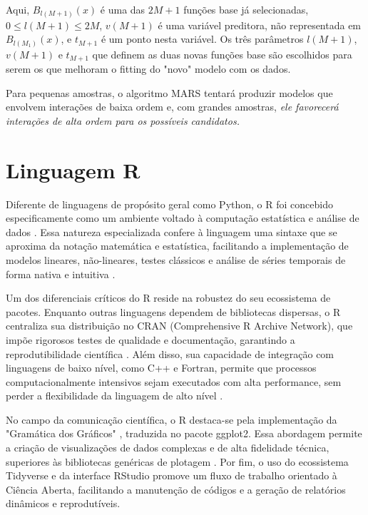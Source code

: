 \documentclass[
    12pt,               %
    openright,          %
    oneside,            %
    a4paper,            %
    english,            %
    brazil              %
    ]{abntex2}
\begin{document}
Aqui, $B_{l(M+1)}(x)$ é uma das $2M + 1$ funções base já selecionadas, $0 \leq l(M+1) \leq 2M$, $v(M+1)$ é uma variável preditora, não
representada em $B_{l(M_1)}(x)$, e $t_{M+1}$ é um ponto nesta variável. Os três parâmetros $l(M+1)$, $v(M+1)$ e $t_{M+1}$ que definem as
duas novas funções base são escolhidos para serem os que melhoram o fitting do "novo" modelo com os dados.

Para pequenas amostras, o algoritmo MARS tentará produzir modelos que envolvem interações de baixa ordem e, com grandes amostras, 
\textit{ele favorecerá interações de alta ordem para os possíveis candidatos.}

\section{Linguagem R}

Diferente de linguagens de propósito geral como Python, o R foi concebido especificamente como um ambiente voltado à computação 
estatística e análise de dados \cite{Ihaka1996}. Essa natureza especializada confere à linguagem uma sintaxe que se aproxima 
da notação matemática e estatística, facilitando a implementação de modelos lineares, não-lineares, testes clássicos e análise de séries 
temporais de forma nativa e intuitiva \cite{Field2012}.

Um dos diferenciais críticos do R reside na robustez do seu ecossistema de pacotes. Enquanto outras linguagens dependem de bibliotecas 
dispersas, o R centraliza sua distribuição no CRAN (Comprehensive R Archive Network), que impõe rigorosos testes de qualidade e 
documentação, garantindo a reprodutibilidade científica \cite{Wickham2014}. Além disso, sua capacidade de integração com linguagens de 
baixo nível, como C++ e Fortran, permite que processos computacionalmente intensivos sejam executados com alta performance, sem perder 
a flexibilidade da linguagem de alto nível \cite{RCoreTeam2025}.

No campo da comunicação científica, o R destaca-se pela implementação da "Gramática dos Gráficos" \cite{Wilkinson2005}, traduzida no pacote 
ggplot2. Essa abordagem permite a criação de visualizações de dados complexas e de alta fidelidade técnica, superiores às bibliotecas 
genéricas de plotagem \cite{Wickham2016}. Por fim, o uso do ecossistema Tidyverse e da interface RStudio \cite{Posit2025} promove um fluxo de
trabalho orientado à Ciência Aberta, facilitando a manutenção de códigos e a geração de relatórios dinâmicos e reprodutíveis.
\end{document}
